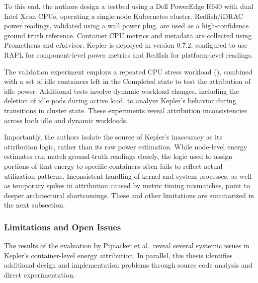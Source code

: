 To this end, the authors design a testbed using a Dell PowerEdge R640 with dual Intel Xeon CPUs, operating a single-node Kubernetes cluster. Redfish/iDRAC power readings, validated using a wall power plug, are used as a high-confidence ground truth reference. Container CPU metrics and metadata are collected using Prometheus and cAdvisor. Kepler is deployed in version 0.7.2, configured to use RAPL for component-level power metrics and Redfish for platform-level readings.

The validation experiment employs a repeated CPU stress workload (), combined with a set of idle containers left in the Completed state to test the attribution of idle power. Additional tests involve dynamic workload changes, including the deletion of idle pods during active load, to analyze Kepler's behavior during transitions in cluster state. These experiments reveal attribution inconsistencies across both idle and dynamic workloads.

Importantly, the authors isolate the source of Kepler’s inaccuracy as its attribution logic, rather than its raw power estimation. While node-level energy estimates can match ground-truth readings closely, the logic used to assign portions of that energy to specific containers often fails to reflect actual utilization patterns. Inconsistent handling of kernel and system processes, as well as temporary spikes in attribution caused by metric timing mismatches, point to deeper architectural shortcomings. These and other limitations are summarized in the next subsection.

\subsubsection{Limitations and Open Issues}

The results of the evaluation by Pijnacker et al.\ reveal several systemic issues in Kepler’s container-level energy attribution. In parallel, this thesis identifies additional design and implementation problems through source code analysis and direct experimentation.

